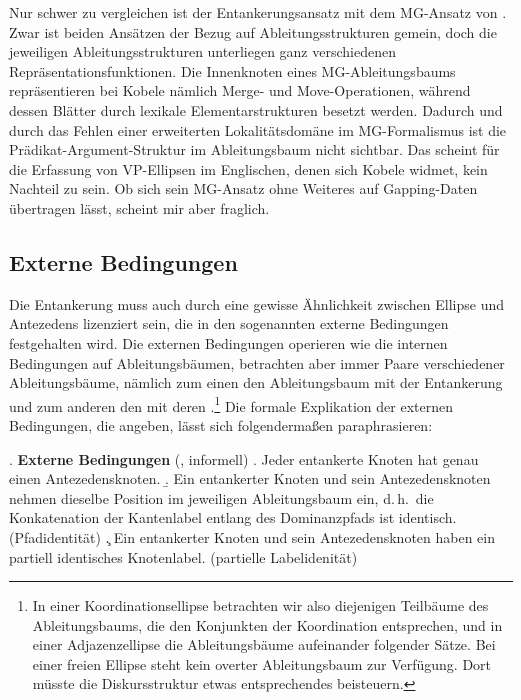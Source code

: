 Nur schwer zu vergleichen ist der Entankerungsansatz mit dem MG-Ansatz von \cite{Kobele:09}. Zwar ist beiden Ansätzen der Bezug auf Ableitungsstrukturen gemein, doch die jeweiligen Ableitungsstrukturen unterliegen ganz verschiedenen Repräsentationsfunktionen. Die Innenknoten eines MG-Ableitungsbaums repräsentieren bei Kobele nämlich Merge- und Move-Operationen, während dessen Blätter durch lexikale Elementarstrukturen besetzt werden. Dadurch und durch das Fehlen einer erweiterten Lokalitätsdomäne im MG-Formalismus ist die Prädikat-Argument-Struktur im Ableitungsbaum nicht sichtbar. Das scheint für die Erfassung von VP-Ellipsen im Englischen, denen sich Kobele widmet, kein Nachteil zu sein. Ob sich sein MG-Ansatz ohne Weiteres auf Gapping-Daten übertragen lässt, scheint mir aber fraglich.

\subsection{Externe Bedingungen}\label{sec-deanchoring-extern}

Die Entankerung muss auch durch eine gewisse Ähnlichkeit zwischen Ellipse und Antezedens lizenziert sein, die in den sogenannten externe Bedingungen festgehalten wird. Die externen Bedingungen operieren wie die internen Bedingungen auf Ableitungsbäumen, betrachten aber immer Paare verschiedener Ableitungsbäume, nämlich zum einen den Ableitungsbaum mit der Entankerung und zum anderen den  mit deren .\footnote{In einer Koordinationsellipse betrachten wir also diejenigen Teilbäume des Ableitungsbaums, die den Konjunkten der Koordination entsprechen, und in einer Adjazenzellipse die Ableitungsbäume aufeinander folgender Sätze. Bei einer freien Ellipse steht kein overter Ableitungsbaum zur Verfügung. Dort müsste die Diskursstruktur etwas entsprechendes beisteuern.} Die formale Explikation der externen Bedingungen, die \cite{Lichte:Kallmeyer:10} angeben, lässt sich folgenderma\ss en paraphrasieren:

\ex. {\bf Externe Bedingungen} (\citealt{Lichte:Kallmeyer:10}, informell) \label{ex-entankerung-externe-bedingungen}
\a. Jeder entankerte Knoten hat genau einen Antezedensknoten.
\b. Ein entankerter Knoten und sein Antezedensknoten nehmen dieselbe Position im jeweiligen Ableitungsbaum ein, d.\,h.\ die Konkatenation der Kantenlabel entlang des Dominanzpfads ist identisch. (Pfadidentität)
\c. Ein entankerter Knoten und sein Antezedensknoten haben ein partiell identisches Knotenlabel. (partielle Labelidenität)    

